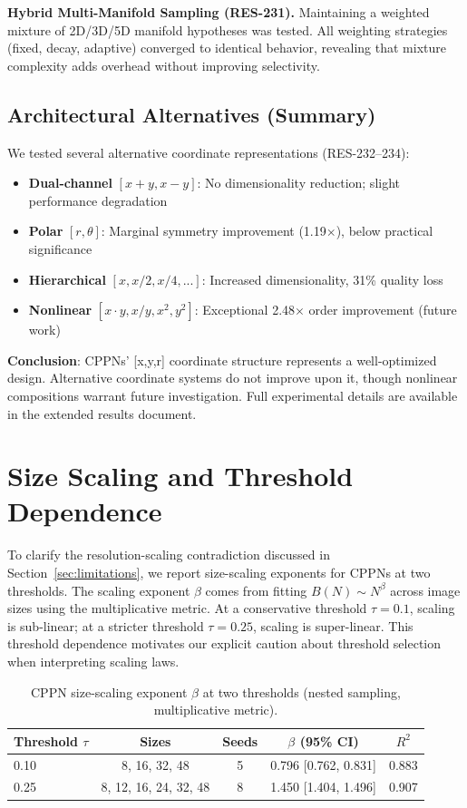 \textbf{Hybrid Multi-Manifold Sampling (RES-231).} Maintaining a weighted mixture of 2D/3D/5D manifold hypotheses was tested. All weighting strategies (fixed, decay, adaptive) converged to identical behavior, revealing that mixture complexity adds overhead without improving selectivity.

\subsection{Architectural Alternatives (Summary)}

We tested several alternative coordinate representations (RES-232--234):
\begin{itemize}
    \item \textbf{Dual-channel} $[x+y, x-y]$: No dimensionality reduction; slight performance degradation
    \item \textbf{Polar} $[r, \theta]$: Marginal symmetry improvement (1.19$\times$), below practical significance
    \item \textbf{Hierarchical} $[x, x/2, x/4, ...]$: Increased dimensionality, 31\% quality loss
    \item \textbf{Nonlinear} $[x \cdot y, x/y, x^2, y^2]$: Exceptional 2.48$\times$ order improvement (future work)
\end{itemize}

\textbf{Conclusion}: CPPNs' [x,y,r] coordinate structure represents a well-optimized design. Alternative coordinate systems do not improve upon it, though nonlinear compositions warrant future investigation. Full experimental details are available in the extended results document.




\section{Size Scaling and Threshold Dependence}
\label{app:size_scaling}

To clarify the resolution-scaling contradiction discussed in Section~\ref{sec:limitations}, we report size-scaling exponents for CPPNs at two thresholds. The scaling exponent $\beta$ comes from fitting $B(N) \sim N^{\beta}$ across image sizes using the multiplicative metric. At a conservative threshold $\tau=0.1$, scaling is sub-linear; at a stricter threshold $\tau=0.25$, scaling is super-linear. This threshold dependence motivates our explicit caution about threshold selection when interpreting scaling laws.

\begin{table}[H]
\centering
\caption{CPPN size-scaling exponent $\beta$ at two thresholds (nested sampling, multiplicative metric).}
\label{tab:size_scaling_thresholds}
\begin{tabular}{lcccc}
\toprule
Threshold $\tau$ & Sizes & Seeds & $\beta$ (95\% CI) & $R^2$ \\
\midrule
0.10 & 8, 16, 32, 48 & 5 & 0.796 [0.762, 0.831] & 0.883 \\
0.25 & 8, 12, 16, 24, 32, 48 & 8 & 1.450 [1.404, 1.496] & 0.907 \\
\bottomrule
\end{tabular}
\end{table}


